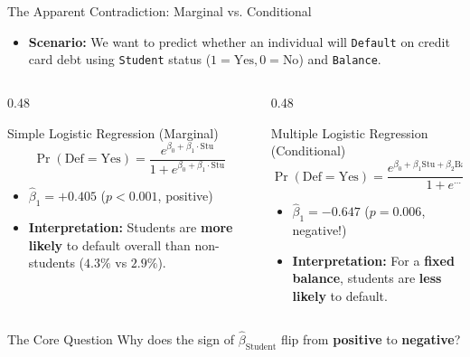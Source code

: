 \documentclass[aspectratio=169, 11pt]{beamer}
\begin{document}
\begin{frame}{The Apparent Contradiction: Marginal vs. Conditional}
\begin{itemize}
    \item \textbf{Scenario:} We want to predict whether an individual will \texttt{Default} on credit card debt using \texttt{Student} status ($1 = \text{Yes}, 0 = \text{No}$) and \texttt{Balance}.
\end{itemize}

\vspace{-0.2cm}
\footnotesize
\begin{columns}[T]
    \begin{column}{0.48\textwidth}
        \begin{block}{Simple Logistic Regression (Marginal)}
            $$\Pr(\text{Def} = \text{Yes}) = \frac{e^{\beta_0 + \beta_1 \cdot \text{Stu}}}{1 + e^{\beta_0 + \beta_1 \cdot \text{Stu}}}$$
            \begin{itemize}
                \item $\hat{\beta}_1 = +0.405$ ($p < 0.001$, positive)
                \item \textbf{Interpretation:} Students are \textbf{more likely} to default overall than non-students ($4.3\%$ vs $2.9\%$).
            \end{itemize}
        \end{block}
    \end{column}

    \begin{column}{0.48\textwidth}
        \begin{block}{Multiple Logistic Regression (Conditional)}
            $$\Pr(\text{Def} = \text{Yes}) = \frac{e^{\beta_0 + \beta_1 \text{Stu} + \beta_2 \text{Bal} + \beta_3 \text{Inc}}}{1 + e^{\cdots}}$$
            \begin{itemize}
                \item $\hat{\beta}_1 = -0.647$ ($p = 0.006$, negative!)
                \item \textbf{Interpretation:} For a \textbf{fixed balance}, students are \textbf{less likely} to default.
            \end{itemize}
        \end{block}
    \end{column}
\end{columns}

\vspace{0.2cm}
\begin{alertblock}{The Core Question}
    Why does the sign of $\hat{\beta}_{\text{Student}}$ flip from \textbf{positive} to \textbf{negative}?
\end{alertblock}
\end{frame}
\end{document}
